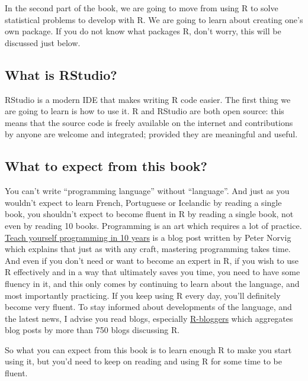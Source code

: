 \documentclass[]{gitbook}
\theoremstyle{definition}
\theoremstyle{definition}
\theoremstyle{definition}
\theoremstyle{remark}
\begin{document}
In the second part of the book, we are going to move from using R to
solve statistical problems to develop with R. We are going to learn
about creating one's own package. If you do not know what packages R,
don't worry, this will be discussed just below.

\hypertarget{what-is-rstudio}{%
\subsection*{What is RStudio?}\label{what-is-rstudio}}

RStudio is a modern IDE that makes writing R code easier. The first
thing we are going to learn is how to use it. R and RStudio are both
open source: this means that the source code is freely available on the
internet and contributions by anyone are welcome and integrated;
provided they are meaningful and useful.

\hypertarget{what-to-expect-from-this-book}{%
\subsection*{What to expect from this
book?}\label{what-to-expect-from-this-book}}

You can't write ``programming language'' without ``language''. And just
as you wouldn't expect to learn French, Portuguese or Icelandic by
reading a single book, you shouldn't expect to become fluent in R by
reading a single book, not even by reading 10 books. Programming is an
art which requires a lot of practice.
\href{http://www.norvig.com/21-days.html}{Teach yourself programming in
10 years} is a blog post written by Peter Norvig which explains that
just as with any craft, mastering programming takes time. And even if
you don't need or want to become an expert in R, if you wish to use R
effectively and in a way that ultimately saves you time, you need to
have some fluency in it, and this only comes by continuing to learn
about the language, and most importantly practicing. If you keep using R
every day, you'll definitely become very fluent. To stay informed about
developments of the language, and the latest news, I advise you read
blogs, especially \href{https://www.r-bloggers.com/}{R-bloggers} which
aggregates blog posts by more than 750 blogs discussing R.

So what you can expect from this book is to learn enough R to make you
start using it, but you'd need to keep on reading and using R for some
time to be fluent.
\end{document}
